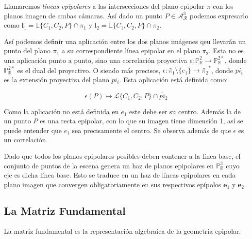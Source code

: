 \documentclass[
10pt, %
a4paper, %
oneside, %
headinclude,footinclude, %
BCOR=5mm, %
]{scrartcl}
\begin{document}
\begin{definition}
    Llamaremos \textit{líneas epipolares} a las intersecciones del plano epipolar $\pi$ con los planos imagen de ambas cámaras. Así dado un punto $P \in \mathcal{A}_\mathcal{R}^3$ podemos expresarlo como $\mathbf{l}_1 = \mathbb{L}\{C_1, C_2, P\} \cap \pi_1$ y $\mathbf{l}_2 = \mathbb{L}\{C_1, C_2, P\} \cap \pi_2$. 
\end{definition}

\vspace{2ex}

Así podemos definir una aplicación entre los dos planos imágenes qeu llevarán un punto del plano $\pi_1$ a su correspondiente línea epipolar en el plano $\pi_2$. Esta no es una aplicación punto a punto, sino una correlación proyectiva $\epsilon: \mathbb{P}^2_\mathbb{R} \longrightarrow \mathbb{P}^{2*}_\mathbb{R}$, donde $\mathbb{P}^{2*}_\mathbb{R}$ es el dual del proyectivo. O siendo más precisos, $\epsilon: \tilde{\pi_1} \setminus \{e_1\} \longrightarrow \tilde{\pi_2}^*$, donde $\tilde{pi_i}$ es la extensión proyectiva del plano $pi_i$. Esta aplicación está definida como:

\begin{equation}
    \epsilon (P) \longmapsto \mathcal{L}\{C_1, C_2, P\} \cap \tilde{pi_2}
\end{equation}

Como la aplicación no está definida en $e_1$ este debe ser su centro. Además la de un punto $P$ es una recta epipolar, con lo que su imagen tiene dimensión 1, así se puede entender que $e_1$ sea precisamente el centro. Se observa además de que $\epsilon$ es un correlación.

\begin{observacion}
    Dado que todos los planos epipolares posibles deben contener a la línea base, el conjunto de puntos de la escena genera un haz de planos epipolares en $\mathbb{P}^3_\mathbb{R}$ cuyo eje es dicha línea base. Esto se traduce en un haz de líneas epipolares en cada plano imagen que convergen obligatoriamente en sus respectivos epípolos $\mathbf{e}_1$ y $\mathbf{e}_2$.
\end{observacion}

\subsection{La Matriz Fundamental}

La matriz fundamental es la representación algebraica de la geometría epipolar.
\end{document}
